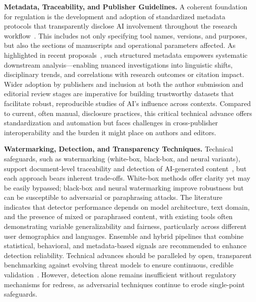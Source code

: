 \documentclass[sigconf]{acmart}
\begin{document}
\textbf{Metadata, Traceability, and Publisher Guidelines.}  
A coherent foundation for regulation is the development and adoption of standardized metadata protocols that transparently disclose AI involvement throughout the research workflow~\cite{ref95,ref100,ref101,ref106}. This includes not only specifying tool names, versions, and purposes, but also the sections of manuscripts and operational parameters affected. As highlighted in recent proposals~\cite{ref106}, such structured metadata empowers systematic downstream analysis---enabling nuanced investigations into linguistic shifts, disciplinary trends, and correlations with research outcomes or citation impact. Wider adoption by publishers and inclusion at both the author submission and editorial review stages are imperative for building trustworthy datasets that facilitate robust, reproducible studies of AI's influence across contexts. Compared to current, often manual, disclosure practices, this critical technical advance offers standardization and automation but faces challenges in cross-publisher interoperability and the burden it might place on authors and editors.

\textbf{Watermarking, Detection, and Transparency Techniques.}  
Technical safeguards, such as watermarking (white-box, black-box, and neural variants), support document-level traceability and detection of AI-generated content~\cite{ref53,ref86,ref91,ref97,ref98,ref100}, but each approach bears inherent trade-offs. White-box methods offer clarity yet may be easily bypassed; black-box and neural watermarking improve robustness but can be susceptible to adversarial or paraphrasing attacks. The literature~\cite{ref100} indicates that detector performance depends on model architecture, text domain, and the presence of mixed or paraphrased content, with existing tools often demonstrating variable generalizability and fairness, particularly across different user demographics and languages. Ensemble and hybrid pipelines that combine statistical, behavioral, and metadata-based signals are recommended to enhance detection reliability. Technical advances should be paralleled by open, transparent benchmarking against evolving threat models to ensure continuous, credible validation~\cite{ref1,ref2,ref31,ref80,ref85,ref86,ref98,ref106}. However, detection alone remains insufficient without regulatory mechanisms for redress, as adversarial techniques continue to erode single-point safeguards.
\end{document}
